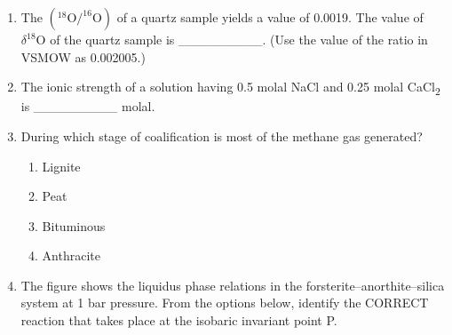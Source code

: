 \documentclass[journal,12pt,onecolumn]{IEEEtran}
\begin{document}
\begin{enumerate}
\begin{enumerate}
\hfill{}

\begin{multicols}{2}
\begin{enumerate}
\item galena < chalcopyrite < sphalerite < magnetite
\item sphalerite < galena < magnetite < chalcopyrite
\item galena < magnetite < chalcopyrite < sphalerite
\item sphalerite < magnetite < chalcopyrite < galena
\end{enumerate}
\end{multicols}

\item The $(^{18}\mathrm{O}/^{16}\mathrm{O})$ of a quartz sample yields a value of 0.0019. The value of $\delta^{18}\mathrm{O}$ of the quartz sample is _________.   (Use the value of the ratio in VSMOW as 0.002005.) 

\hfill{}


\item The ionic strength of a solution having 0.5 molal NaCl and 0.25 molal CaCl\textsubscript{2} is _________ molal.

\hfill{}


\item During which stage of coalification is most of the methane gas generated?

\hfill{}

\begin{multicols}{4}
\begin{enumerate}
\item Lignite
\item Peat
\item Bituminous
\item Anthracite
\end{enumerate}
\end{multicols}

\item The figure shows the liquidus phase relations in the forsterite–anorthite–silica system at 1 bar pressure. From the options below, identify the CORRECT reaction that takes place at the isobaric invariant point P.

\hfill{}


\end{enumerate}
\end{enumerate}
\end{document}

